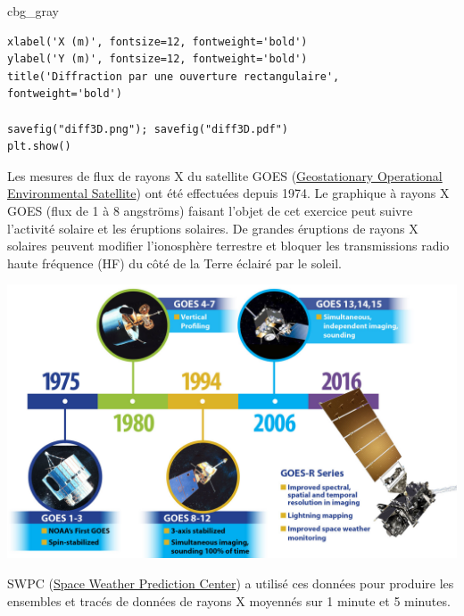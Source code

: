 \documentclass[%
oneside,                 %
final,                   %
10pt,french]{article}
\newenvironment{_cod_tight}[1]{
   \def\FrameCommand{\colorbox{#1}}
   \FrameRule0.6pt\MakeFramed {\FrameRestore}\vskip3mm}
   {\vskip0mm\endMakeFramed}
\newenvironment{cod}[1]{
\bgroup\rmfamily
\fboxsep=0mm\relax
\begin{_cod_tight}{#1}
\list{}{\parsep=-2mm\parskip=0mm\topsep=0pt\leftmargin=2mm
\rightmargin=2\leftmargin\leftmargin=4pt\relax}
\item\relax}
{\endlist\end{_cod_tight}\egroup}
\newenvironment{doconceexercise}{}{}
\newcounter{doconceexercisecounter}
\begin{document}
\begin{doconceexercise}
\begin{cod}{cbg_gray}
\begin{verbatim}
xlabel('X (m)', fontsize=12, fontweight='bold')
ylabel('Y (m)', fontsize=12, fontweight='bold')
title('Diffraction par une ouverture rectangulaire', fontweight='bold')

savefig("diff3D.png"); savefig("diff3D.pdf")
plt.show()
\end{verbatim}
\end{cod}
\noindent


\end{doconceexercise}




\begin{doconceexercise}



Les mesures de flux de rayons X du satellite GOES (\href{{https://fr.wikipedia.org/wiki/Geostationary_Operational_Environmental_Satellite}}{Geostationary Operational Environmental Satellite}) ont été effectuées depuis 1974. Le graphique à rayons X GOES (flux de 1 à 8 angströms) faisant l’objet de cet exercice peut suivre l’activité solaire et les éruptions solaires. De grandes éruptions de rayons X solaires peuvent modifier l'ionosphère terrestre et bloquer les transmissions radio haute fréquence (HF) du côté de la Terre éclairé par le soleil.



\vspace{6mm}

\centerline{\includegraphics[width=0.7\linewidth]{figs/goes_sat.jpeg}}

\vspace{6mm}



SWPC (\href{{https://www.swpc.noaa.gov/products/goes-x-ray-flux}}{Space Weather Prediction Center}) a utilisé ces données pour produire les ensembles et tracés de données de rayons X moyennés sur 1 minute et 5 minutes.



\end{doconceexercise}
\end{document}
